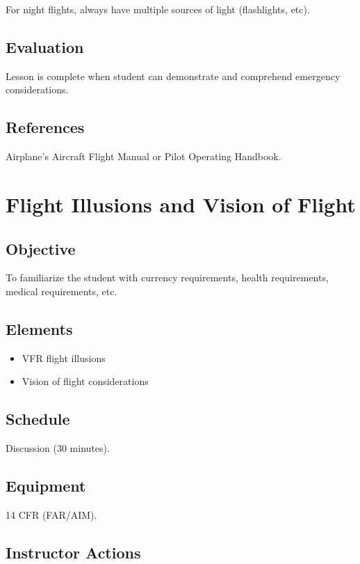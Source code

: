\documentclass[twoside,openright]{report}
\begin{document}
For night flights, always have multiple sources of light (flashlights, etc).

\section{Evaluation}


Lesson is complete when student can demonstrate and comprehend emergency
considerations.

\section{References}

Airplane’s Aircraft Flight Manual or Pilot Operating Handbook.

\chapter{Flight Illusions and Vision of Flight}

\section{Objective}

To familiarize the student with currency requirements, health requirements, medical requirements, etc.

\section{Elements}

\begin{itemize}
  \item VFR flight illusions
  \item Vision of flight considerations
\end{itemize}

\section{Schedule}

Discussion (30 minutes).

\section{Equipment}

14 CFR (FAR/AIM).

\section{Instructor Actions}
\end{document}
